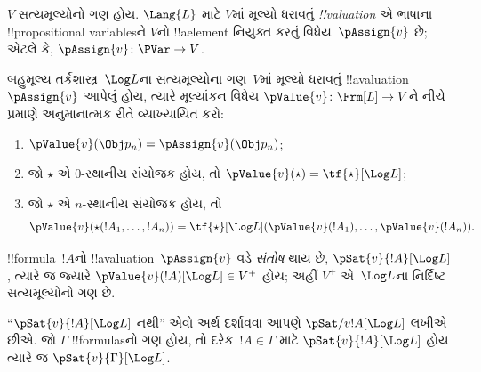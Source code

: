 \documentclass[../../../include/open-logic-section]{subfiles}
\begin{document}


\begin{defn}[!!^{valuation}s]
$V$ સત્યમૂલ્યોનો ગણ હોય. $\Lang{L}$ માટે $V$માં મૂલ્યો ધરાવતું
\emph{!!{valuation}} એ ભાષાના !!{propositional variable}sને $V$નો
!!a{element} નિયુક્ત કરતું વિધેય~$\pAssign{v}$ છે; એટલે કે,
$\pAssign{v} \colon \PVar \to V$.
\end{defn}

\begin{defn}
બહુમૂલ્ય તર્કશાસ્ત્ર~$\Log L$ના સત્યમૂલ્યોના ગણ~$V$માં મૂલ્યો
ધરાવતું !!a{valuation}~$\pAssign{v}$ આપેલું હોય, ત્યારે મૂલ્યાંકન
વિધેય $\pValue{v} \colon \Frm[L] \to V$ને નીચે પ્રમાણે અનુમાનાત્મક
રીતે વ્યાખ્યાયિત કરો:
  \begin{enumerate}
    \item $\pValue{v}(\Obj p_n) = \pAssign{v}(\Obj p_n)$;
    \item જો $\star$ એ $0$-સ્થાનીય સંયોજક હોય, તો $\pValue{v}(\star)  = \tf{\star}[\Log L]$;
    \item જો $\star$ એ $n$-સ્થાનીય સંયોજક હોય, તો
    \[
      \pValue{v}(\star(!A_1, \dots, !A_n)) = \tf{\star}[\Log L]
      (\pValue{v}(!A_1), \dots, \pValue{v}(!A_n)).
    \]
  \end{enumerate}
\end{defn}

\begin{defn}[સંતોષ]
 !!{formula}~$!A$નો !!a{valuation}~$\pAssign{v}$
વડે \emph{સંતોષ} થાય છે, $\pSat{v}{!A}[\Log L]$, ત્યારે જ જ્યારે
$\pValue{v}(!A)[\Log L] \in V^+$ હોય; અહીં $V^+$ એ~$\Log L$ના
નિર્દિષ્ટ સત્યમૂલ્યોનો ગણ છે.

``$\pSat{v}{!A}[\Log L]$ નથી'' એવો અર્થ દર્શાવવા આપણે
$\pSat/{v}{!A}[\Log L]$ લખીએ છીએ. જો $\Gamma$ !!{formula}sનો ગણ હોય, તો
દરેક~$!A \in \Gamma$ માટે $\pSat{v}{!A}[\Log L]$ હોય ત્યારે જ
$\pSat{v}{\Gamma}[\Log L]$.
\end{defn}
\end{document}
